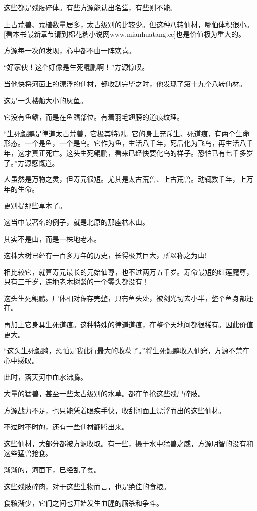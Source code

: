 \begin{this_body}
这些都是残肢碎体。有些方源能认出名堂，有些则不能。

上古荒兽、荒植数量居多，太古级别的比较少。但这种八转仙材，哪怕体积很小。[看本书最新章节请到棉花糖小说网www.mianhuatang.cc]也是价值极为重大的。

方源每一次的发现，心中都不由一阵欢喜。

“好家伙！这个好像是生死鲲鹏啊！”方源惊叹。

当他快将河面上的漂浮的仙材，都收刮完毕之时，他发现了第十九个八转仙材。

这是一头楼船大小的灰鱼。

它没有鱼鳍，而是在鱼鳍部位。有着羽毛翅膀的道痕纹理。

“生死鲲鹏是律道太古荒兽，它极其特别。它的身上充斥生、死道痕，有两个生命形态。一个是鱼，一个是鸟。它作为鱼，生活八千年，死后化为飞鸟，再生活八千年，这才真正死亡。这头生死鲲鹏，看来已经快要化鸟的样子。恐怕已有七千多岁了。”方源感慨道。

人虽然是万物之灵，但寿元很短。尤其是太古荒兽、上古荒兽。动辄数千年，上万年的生命。

更别提那些草木了。

这当中最著名的例子，就是北原的那座枯木山。

其实不是山，而是一株地老木。

这株大树已经有一百多万年的历史，长得极其巨大，所以称之为山!

相比较它，就算寿元最长的元始仙尊，也不过两万五千岁。寿命最短的红莲魔尊，只有三千岁，连地老木树龄的一个零头都没有！

这头生死鲲鹏。尸体相对保存完整，只有鱼头处，被剑光切去小半，整个鱼身都还在。

再加上它身具生死道痕。这种特殊的律道道痕，在整个天地间都很稀有。因此价值更大。

“这头生死鲲鹏，恐怕是我此行最大的收获了。”将生死鲲鹏收入仙窍，方源不禁在心中感叹。

此时，落天河中血水沸腾。

大量的猛兽，甚至一些太古级别的水草。都在争抢这些残尸碎肢。

方源战力不足，也只能凭着眼疾手快，收刮河面上漂浮而出的这些仙材。

不过时不时的，还有一些仙材翻腾出来。

这些仙材，大部分都被方源收取。有一些，摄于水中猛兽之威，方源明智的没有和这些猛兽抢食。

渐渐的，河面下，已经乱了套。

这些残肢碎肉，对于这些生物而言，也是绝佳的食粮。

食粮渐少，它们之间也开始发生血腥的厮杀和争斗。


\end{this_body}
